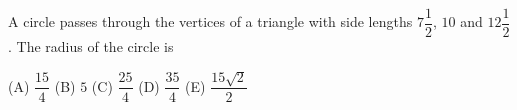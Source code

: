 A circle passes through the vertices of a triangle with side lengths $7\dfrac{1}{2}$, $10$ and $12\dfrac{1}{2}$. The radius of the circle is

(A) $\dfrac{15}{4}$ \quad (B) $5$ \quad (C) $\dfrac{25}{4}$ \quad (D) $\dfrac{35}{4}$ \quad (E) $\dfrac{15\sqrt2}{2}$

